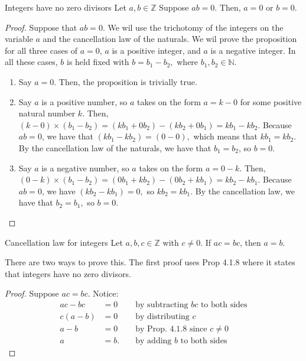 \begin{problem}{Integers have no zero divisors}
	Let $a, b \in \mathbb{Z}$ Suppose $ab = 0.$ Then, $a = 0$ or $b = 0.$
\end{problem}
\begin{proof}
	Suppose that $ab = 0.$
	We wil use the trichotomy of the integers on the variable $a$ and the cancellation law of the naturals. 
	We wil prove the proposition for all three cases of $a = 0$, $a$ is a positive integer, and $a$ is a negative integer.
	In all these cases, $b$ is held fixed with $b = b_1 \minus b_2, $ where $b_1, b_2 \in \mathbb{N}.$
	\begin{enumerate}
		\item Say $a = 0$. Then, the proposition is trivially true.
		\item Say $a$ is a positive number, so $a$ takes on the form $a = k \minus 0$ for some positive natural number $k.$
	Then, $(k \minus 0) \times (b_1 \minus b_2) = (k b_1 + 0 b_2) \minus (k b_2 + 0 b_1) = kb_1 \minus k b_2.$
	Because $ab = 0$, we have that $(k b_1 \minus k b_2) = (0 \minus 0),$ which means that $k b_1 = k b_2.$
	By the cancellation law of the naturals, we have that $b_1 = b_2$, so $b = 0.$
		\item Say $a$ is a negative number, so $a$ takes on the form $a = 0 \minus k.$ 
	Then, $(0 \minus k) \times (b_1 \minus b_2) = (0 b_1 + k b_2) \minus (0 b_2 + k b_1) = k b_2 \minus k b_1.$
	Because $ab = 0$, we have $(k b_2 \minus k b _1) = 0,$ so $k b_2 = k b_1.$
	By the cancellation law, we have that $b_2 = b_1,$ so $b = 0.$
	\end{enumerate}
\end{proof}

\begin{problem}{Cancellation law for integers}
	Let $a, b, c \in \mathbb{Z}$ with $c \neq 0.$ If $ac = bc$, then $a = b.$
\end{problem}
There are two ways to prove this. 
The first proof uses Prop 4.1.8 where it states that integers have no zero divisors. 
\begin{proof}
	Suppose $ac = bc.$ Notice:
	\begin{align*}
		ac - bc &= 0 && \text{ by subtracting $bc$ to both sides}\\
		c(a - b) &= 0 && \text{ by distributing $c$}\\
		a - b &= 0 &&\text{ by Prop. 4.1.8 since $c \neq 0$}\\
		a &= b. && \text{ by adding $b$ to both sides}
	\end{align*}
\end{proof}

